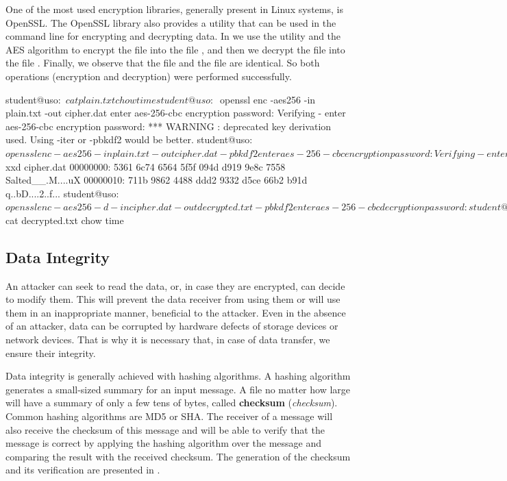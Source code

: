 One of the most used encryption libraries, generally present in Linux systems, is OpenSSL.
The OpenSSL library also provides a utility that can be used in the command line for encrypting and decrypting data.
In  we use the  utility and the AES algorithm to encrypt the file  into the file , and then we decrypt the file  into the file .
Finally, we observe that the file  and the file  are identical.
So both operations (encryption and decryption) were performed successfully.

\begin{screen}[caption={Encryption and decryption using openssl},label={lst:sec:openssl}]
student@uso:~$ cat plain.txt
chow time
student@uso:~$ openssl enc -aes256 -in plain.txt -out cipher.dat
enter aes-256-cbc encryption password:
Verifying - enter aes-256-cbc encryption password:
*** WARNING : deprecated key derivation used.
Using -iter or -pbkdf2 would be better.
student@uso:~$ openssl enc -aes256 -in plain.txt -out cipher.dat -pbkdf2
enter aes-256-cbc encryption password:
Verifying - enter aes-256-cbc encryption password:
student@uso:~$ xxd cipher.dat
00000000: 5361 6c74 6564 5f5f 094d d919 9e8c 7558  Salted__.M....uX
00000010: 711b 9862 4488 ddd2 9332 d5ce 66b2 b91d  q..bD....2..f...
student@uso:~$ openssl enc -aes256 -d -in cipher.dat -out decrypted.txt -pbkdf2
enter aes-256-cbc decryption password:
student@uso:~$ cat decrypted.txt
chow time
\end{screen}

\subsection{Data Integrity}
\label{sec:sec:data:integrity}

An attacker can seek to read the data, or, in case they are encrypted, can decide to modify them.
This will prevent the data receiver from using them or will use them in an inappropriate manner, beneficial to the attacker.
Even in the absence of an attacker, data can be corrupted by hardware defects of storage devices or network devices.
That is why it is necessary that, in case of data transfer, we ensure their integrity.

Data integrity is generally achieved with hashing algorithms.
A hashing algorithm generates a small-sized summary for an input message.
A file no matter how large will have a summary of only a few tens of bytes, called \textbf{checksum} (\textit{checksum}).
Common hashing algorithms are MD5 or SHA.
The receiver of a message will also receive the checksum of this message and will be able to verify that the message is correct by applying the hashing algorithm over the message and comparing the result with the received checksum.
The generation of the checksum and its verification are presented in .

